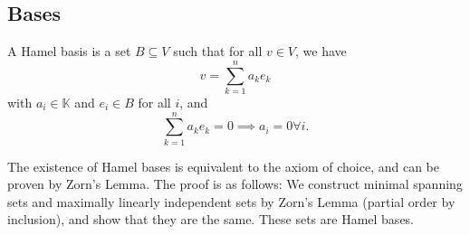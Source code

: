 \documentclass[twoside,symmetric, openany, 12pt]{./tuftebook}
\theoremstyle{definition}
\theoremstyle{definition}
\theoremstyle{definition}
\begin{document}
	\subsection{Bases}
	\begin{Definition}
		A Hamel basis is a set $B\subseteq V$ such that for all $v\in V$, we have
		\[v=\sum_{k=1}^n a_k e_k\]
		with $a_i\in \mathbb{K}$ and $e_i\in B$ for all $i$, and
		\[\sum_{k=1}^n a_k e_k=0\implies a_i=0\forall i.\]
	\end{Definition}
	The existence of Hamel bases is equivalent to the axiom of choice, and can be proven by Zorn's Lemma. The proof is as follows: We construct minimal spanning sets and maximally linearly independent sets by Zorn's Lemma (partial order by inclusion), and show that they are the same. These sets are Hamel bases.
	
\end{document}
